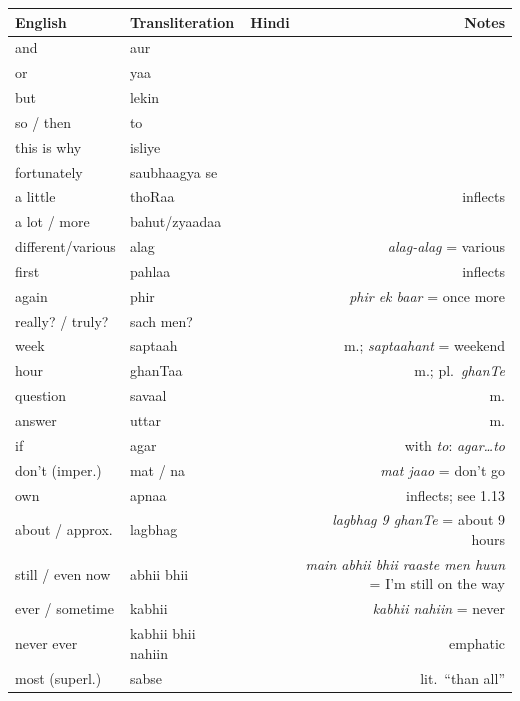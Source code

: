 \begin{tabular}{@{}VTDN@{}}
  \toprule
  English & Transliteration & Hindi & Notes \\
  \midrule
  and              & aur           &              & \\
  or               & yaa           &               & \\
  but              & lekin         &            & \\
  so / then        & to            &               & \\
  this is why      & isliye        &            & \\
  fortunately      & saubhaagya se &       & \\
  a little         & thoRaa        &            & inflects \\
  a lot / more     & bahut/zyaadaa &   & \\
  different/various & alag         &              & \textit{alag-alag} = various \\
  first            & pahlaa        &             & inflects \\
  again            & phir          &              & \textit{phir ek baar} = once more \\
  really? / truly? & sach men?     &          & \\
  week             & saptaah       &           & m.; \textit{saptaahant} = weekend \\
  hour             & ghanTaa       &             & m.; pl.\ \textit{ghanTe} \\
  question         & savaal        &             & m. \\
  answer           & uttar         &            & m. \\
  if               & agar          &              & with \textit{to}: \textit{agar\ldots to} \\
  don't (imper.)   & mat / na      &           & \textit{mat jaao} = don't go \\
  own              & apnaa         &             & inflects; see 1.13 \\
  about / approx.  & lagbhag       &             & \textit{lagbhag 9 ghanTe} = about 9 hours \\
  still / even now & abhii bhii    &           & \textit{main abhii bhii raaste men huun} = I'm still on the way \\
  ever / sometime  & kabhii        &              & \textit{kabhii nahiin} = never \\
  never ever       & kabhii bhii nahiin &  & emphatic \\
  most (superl.)   & sabse         &             & lit.\ ``than all'' \\
  \bottomrule
\end{tabular}

